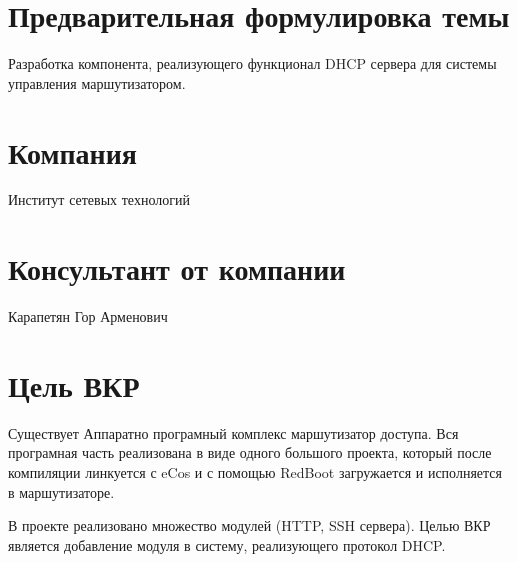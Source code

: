 \documentclass[12pt]{article}
\begin{document}

\section{Предварительная формулировка темы}
Разработка компонента, реализующего функционал DHCP сервера для системы управления маршутизатором.

\section{Компания}
Институт сетевых технологий

\section{Консультант от компании}
Карапетян Гор Арменович

\section{Цель ВКР}
Существует Аппаратно програмный комплекс маршутизатор доступа. Вся програмная часть реализована в виде одного большого проекта, который после компиляции линкуется с eCos и с помощью RedBoot загружается и исполняется в маршутизаторе.

В проекте реализовано множество модулей (HTTP, SSH сервера). Целью ВКР является добавление модуля в систему, реализующего протокол DHCP.

\end{document}
